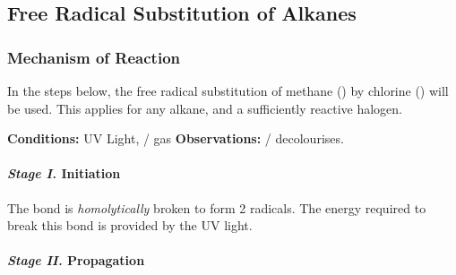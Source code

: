 		\subsection{Free Radical Substitution of Alkanes}

			\subsubsection{Mechanism of Reaction}

				In the steps below, the free radical substitution of methane () by chlorine () will be used. This applies
				for any alkane, and a sufficiently reactive halogen.

				\vspace{1.5em}

				\vbox{\textbf{Conditions:}	\tabto{35mm}UV Light,  /  gas}
				\vbox{\textbf{Observations:}\tabto{35mm}  /   decolourises.}

				\paragraph{\textit{Stage I.\protect\hphantom{II}}\hspace{5mm} Initiation}

					The \ch{\chlorine-\chlorine} bond is \textit{homolytically} broken to form 2 \ch{\chlorine} radicals.
					The energy required to break this bond is provided by the UV light.



				\paragraph{\textit{Stage II.\protect\hphantom{I}}\hspace{5mm} Propagation}


